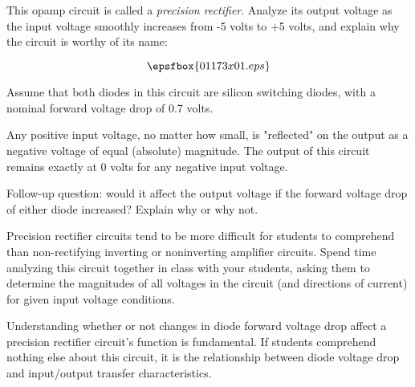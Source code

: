 

This opamp circuit is called a {\it precision rectifier}.  Analyze its output voltage as the input voltage smoothly increases from -5 volts to +5 volts, and explain why the circuit is worthy of its name:

$$\epsfbox{01173x01.eps}$$

Assume that both diodes in this circuit are silicon switching diodes, with a nominal forward voltage drop of 0.7 volts.







Any positive input voltage, no matter how small, is "reflected" on the output as a negative voltage of equal (absolute) magnitude.  The output of this circuit remains exactly at 0 volts for any negative input voltage.

\vskip 10pt

Follow-up question: would it affect the output voltage if the forward voltage drop of either diode increased?  Explain why or why not.







Precision rectifier circuits tend to be more difficult for students to comprehend than non-rectifying inverting or noninverting amplifier circuits.  Spend time analyzing this circuit together in class with your students, asking them to determine the magnitudes of all voltages in the circuit (and directions of current) for given input voltage conditions.

Understanding whether or not changes in diode forward voltage drop affect a precision rectifier circuit's function is fundamental.  If students comprehend nothing else about this circuit, it is the relationship between diode voltage drop and input/output transfer characteristics.




